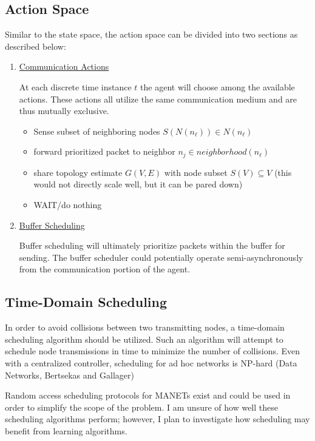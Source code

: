 \documentclass[11pt]{article}
\begin{document}
\subsection{Action Space}
Similar to the state space, the action space can be divided into two sections as described below:

\begin{enumerate}
\item
\underline{Communication Actions}

At each discrete time instance $t$ the agent will choose among the available actions. 
These actions all utilize the same communication medium and are thus mutually 
exclusive.
 
\begin{itemize}
\item
Sense subset of neighboring nodes $S(N(n_\ell)) \in N(n_\ell)$
\item
forward prioritized packet to neighbor $n_j \in neighborhood(n_\ell)$
\item
share topology estimate $G(V,E)$ with node subset $S(V) \subseteq V$
(this would not directly scale well, but it can be pared down)
\item
WAIT/do nothing
\end{itemize}

\item
\underline{Buffer Scheduling}

Buffer scheduling will ultimately prioritize packets within the buffer for sending.
The buffer scheduler could potentially operate semi-asynchronously from the 
communication portion of the agent.  
\end{enumerate}


\subsection{Time-Domain Scheduling}
In order to avoid collisions between two transmitting nodes, a time-domain scheduling 
algorithm should be utilized. Such an algorithm will attempt to 
schedule node transmissions in time to minimize the number of collisions. Even with a 
centralized controller, scheduling for ad hoc networks is NP-hard (Data Networks, Bertsekas and Gallager)

\medskip

Random access scheduling protocols for MANETs exist and could be used in order to 
simplify the scope of the problem. I am unsure of how well these scheduling 
algorithms perform; however, I plan to investigate how scheduling may benefit from 
learning algorithms. 
\end{document}
